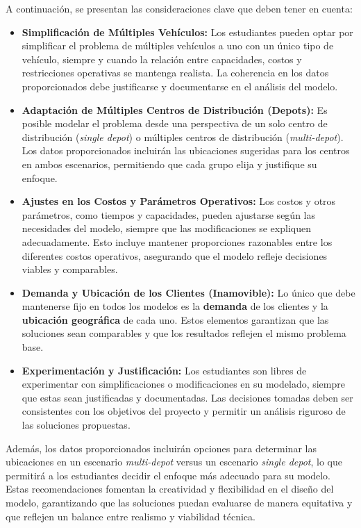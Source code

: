 \documentclass[12pt]{article}
\begin{document}
A continuación, se presentan las consideraciones clave que deben tener en cuenta:

\begin{itemize}
    \item \textbf{Simplificación de Múltiples Vehículos:}  
    Los estudiantes pueden optar por simplificar el problema de múltiples vehículos a uno con un único tipo de vehículo, siempre y cuando la relación entre capacidades, costos y restricciones operativas se mantenga realista. La coherencia en los datos proporcionados debe justificarse y documentarse en el análisis del modelo.
    
    \item \textbf{Adaptación de Múltiples Centros de Distribución (Depots):}  
    Es posible modelar el problema desde una perspectiva de un solo centro de distribución (\textit{single depot}) o múltiples centros de distribución (\textit{multi-depot}). Los datos proporcionados incluirán las ubicaciones sugeridas para los centros en ambos escenarios, permitiendo que cada grupo elija y justifique su enfoque.

    \item \textbf{Ajustes en los Costos y Parámetros Operativos:}  
    Los costos y otros parámetros, como tiempos y capacidades, pueden ajustarse según las necesidades del modelo, siempre que las modificaciones se expliquen adecuadamente. Esto incluye mantener proporciones razonables entre los diferentes costos operativos, asegurando que el modelo refleje decisiones viables y comparables.

    \item \textbf{Demanda y Ubicación de los Clientes (Inamovible):}  
    Lo único que debe mantenerse fijo en todos los modelos es la \textbf{demanda} de los clientes y la \textbf{ubicación geográfica} de cada uno. Estos elementos garantizan que las soluciones sean comparables y que los resultados reflejen el mismo problema base.

    \item \textbf{Experimentación y Justificación:}  
    Los estudiantes son libres de experimentar con simplificaciones o modificaciones en su modelado, siempre que estas sean justificadas y documentadas. Las decisiones tomadas deben ser consistentes con los objetivos del proyecto y permitir un análisis riguroso de las soluciones propuestas.
\end{itemize}

Además, los datos proporcionados incluirán opciones para determinar las ubicaciones en un escenario \textit{multi-depot} versus un escenario \textit{single depot}, lo que permitirá a los estudiantes decidir el enfoque más adecuado para su modelo. Estas recomendaciones fomentan la creatividad y flexibilidad en el diseño del modelo, garantizando que las soluciones puedan evaluarse de manera equitativa y que reflejen un balance entre realismo y viabilidad técnica.
\end{document}
